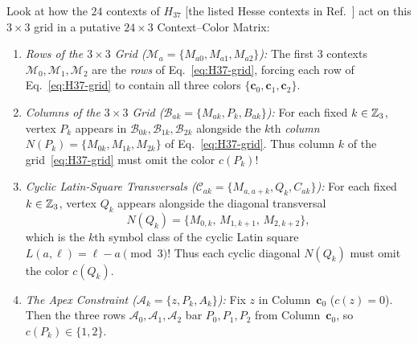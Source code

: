 \documentclass[aps,pra,reprint,superscriptaddress,longbibliography,nofootinbib,floatfix,10pt]{revtex4-2}
\theoremstyle{definition}\newtheorem{definition}[theorem]{Definition}
\theoremstyle{remark}\newtheorem{remark}[theorem]{Remark}
\begin{document}
Look at how the $24$ contexts of $H_{37}$ [the listed Hesse contexts in Ref.~\cite{svozil2026contexts}] act on this $3\times 3$ grid in a putative $24\times 3$ Context--Color Matrix:
\begin{enumerate}
\item \emph{Rows of the $3\times 3$ Grid ($\mathcal{M}_a=\{M_{a0},M_{a1},M_{a2}\}$):} The first $3$ contexts $\mathcal{M}_0,\mathcal{M}_1,\mathcal{M}_2$ are the \emph{rows} of Eq.~\eqref{eq:H37-grid}, forcing each row of Eq.~\eqref{eq:H37-grid} to contain all three colors $\{\mathbf{c}_0,\mathbf{c}_1,\mathbf{c}_2\}$.
\item \emph{Columns of the $3\times 3$ Grid ($\mathcal{B}_{ak}=\{M_{ak},P_k,B_{ak}\}$):} For each fixed $k\in\mathbb Z_3$, vertex $P_k$ appears in $\mathcal{B}_{0k},\mathcal{B}_{1k},\mathcal{B}_{2k}$ alongside the $k$th \emph{column} $N(P_k)=\{M_{0k},M_{1k},M_{2k}\}$ of Eq.~\eqref{eq:H37-grid}. Thus column $k$ of the grid~\eqref{eq:H37-grid} must omit the color $c(P_k)$!
\item \emph{Cyclic Latin-Square Transversals ($\mathcal{C}_{ak}=\{M_{a,a+k},Q_k,C_{ak}\}$):} For each fixed $k\in\mathbb Z_3$, vertex $Q_k$ appears alongside the diagonal transversal
\[
N(Q_k)=\{M_{0,k},\,M_{1,k+1},\,M_{2,k+2}\},
\]
which is the $k$th symbol class of the cyclic Latin square $L(a,\ell)=\ell-a\pmod 3$! Thus each cyclic diagonal $N(Q_k)$ must omit the color $c(Q_k)$.
\item \emph{The Apex Constraint ($\mathcal{A}_k=\{z,P_k,A_k\}$):} Fix $z$ in Column~$\mathbf{c}_0$ ($c(z)=0$). Then the three rows $\mathcal{A}_0,\mathcal{A}_1,\mathcal{A}_2$ bar $P_0,P_1,P_2$ from Column~$\mathbf{c}_0$, so $c(P_k)\in\{1,2\}$.
\end{enumerate}
\end{document}
